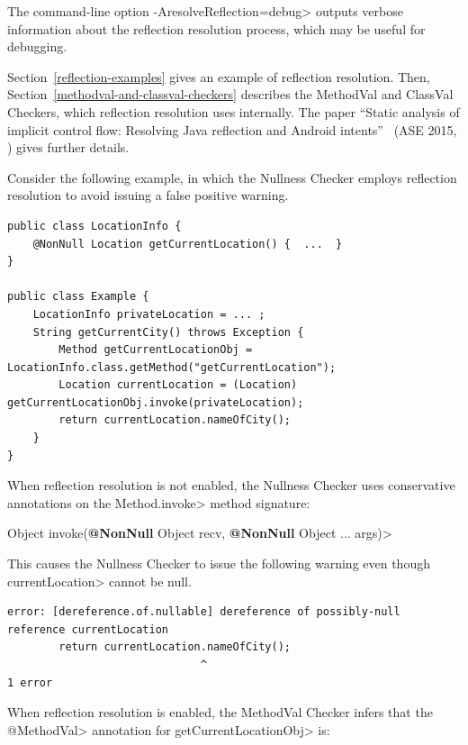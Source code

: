 The command-line option \<-AresolveReflection=debug> outputs verbose
information about the reflection resolution process, which may be useful
for debugging.

Section~\ref{reflection-examples} gives an example of reflection resolution.
Then,
Section~\ref{methodval-and-classval-checkers} describes the MethodVal
and ClassVal Checkers, which reflection resolution uses internally.
The paper ``Static analysis of implicit control flow: Resolving Java reflection and
Android intents''~\cite{BarrosJMVDdAE2015} (ASE 2015,
)
gives further details.



Consider the following example, in which the Nullness Checker employs
reflection resolution to avoid issuing a false positive warning.

\begin{Verbatim}
public class LocationInfo {
    @NonNull Location getCurrentLocation() {  ...  }
}

public class Example {
    LocationInfo privateLocation = ... ;
    String getCurrentCity() throws Exception {
        Method getCurrentLocationObj = LocationInfo.class.getMethod("getCurrentLocation");
        Location currentLocation = (Location) getCurrentLocationObj.invoke(privateLocation);
        return currentLocation.nameOfCity();
    }
}
\end{Verbatim}

When reflection resolution is not enabled, the Nullness Checker uses conservative
annotations on the \<Method.invoke> method signature:

\quad {} Object invoke({\bfseries @NonNull} Object recv, {\bfseries @NonNull} Object ... args)>


This causes the Nullness Checker to issue the following warning even though
\<currentLocation> cannot be null.

\begin{Verbatim}
error: [dereference.of.nullable] dereference of possibly-null reference currentLocation
        return currentLocation.nameOfCity();
                              ^
1 error
\end{Verbatim}

\begin{sloppypar}
When reflection resolution is enabled, the MethodVal Checker infers that the \<@MethodVal> annotation for \<getCurrentLocationObj>  is:
\end{sloppypar}

